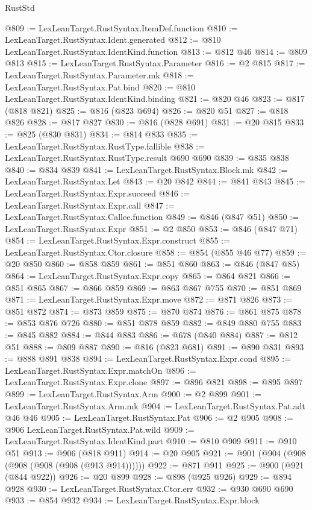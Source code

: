 \begin{lexlean}{RustStd}
\begin{coremodule}
@809 := LexLeanTarget.RustSyntax.ItemDef.function
@810 := LexLeanTarget.RustSyntax.Ident.generated
@812 := @810 LexLeanTarget.RustSyntax.IdentKind.function
@813 := @812 @46
@814 := @809 @813
@815 := LexLeanTarget.RustSyntax.Parameter
@816 := @2 @815
@817 := LexLeanTarget.RustSyntax.Parameter.mk
@818 := LexLeanTarget.RustSyntax.Pat.bind
@820 := @810 LexLeanTarget.RustSyntax.IdentKind.binding
@821 := @820 @46
@823 := @817 (@818 @821)
@825 := @816 (@823 @694)
@826 := @820 @51
@827 := @818 @826
@828 := @817 @827
@830 := @816 (@828 @691)
@831 := @20 @815
@833 := @825 (@830 @831)
@834 := @814 @833
@835 := LexLeanTarget.RustSyntax.RustType.fallible
@838 := LexLeanTarget.RustSyntax.RustType.result @690 @690
@839 := @835 @838
@840 := @834 @839
@841 := LexLeanTarget.RustSyntax.Block.mk
@842 := LexLeanTarget.RustSyntax.Let
@843 := @20 @842
@844 := @841 @843
@845 := LexLeanTarget.RustSyntax.Expr.succeed
@846 := LexLeanTarget.RustSyntax.Expr.call
@847 := LexLeanTarget.RustSyntax.Callee.function
@849 := @846 (@847 @51)
@850 := LexLeanTarget.RustSyntax.Expr
@851 := @2 @850
@853 := @846 (@847 @71)
@854 := LexLeanTarget.RustSyntax.Expr.construct
@855 := LexLeanTarget.RustSyntax.Ctor.closure
@858 := @854 (@855 @46 @77)
@859 := @20 @850
@860 := @858 @859
@861 := @851 @860
@863 := @846 (@847 @85)
@864 := LexLeanTarget.RustSyntax.Expr.copy
@865 := @864 @821
@866 := @851 @865
@867 := @866 @859
@869 := @863 @867 @755
@870 := @851 @869
@871 := LexLeanTarget.RustSyntax.Expr.move
@872 := @871 @826
@873 := @851 @872
@874 := @873 @859
@875 := @870 @874
@876 := @861 @875
@878 := @853 @876 @726
@880 := @851 @878 @859
@882 := @849 @880 @755
@883 := @845 @882
@884 := @844 @883
@886 := @678 (@840 @884)
@887 := @812 @51
@888 := @809 @887
@890 := @816 (@823 @681)
@891 := @890 @831
@893 := @888 @891 @838
@894 := LexLeanTarget.RustSyntax.Expr.cond
@895 := LexLeanTarget.RustSyntax.Expr.matchOn
@896 := LexLeanTarget.RustSyntax.Expr.clone
@897 := @896 @821
@898 := @895 @897
@899 := LexLeanTarget.RustSyntax.Arm
@900 := @2 @899
@901 := LexLeanTarget.RustSyntax.Arm.mk
@904 := LexLeanTarget.RustSyntax.Pat.adt @46 @46
@905 := LexLeanTarget.RustSyntax.Pat
@906 := @2 @905
@908 := @906 LexLeanTarget.RustSyntax.Pat.wild
@909 := LexLeanTarget.RustSyntax.IdentKind.part
@910 := @810 @909
@911 := @910 @51
@913 := @906 (@818 @911)
@914 := @20 @905
@921 := @901 (@904 (@908 (@908 (@908 (@908 (@913 @914))))))
@922 := @871 @911
@925 := @900 (@921 (@844 @922))
@926 := @20 @899
@928 := @898 (@925 @926)
@929 := @894 @928
@930 := LexLeanTarget.RustSyntax.Ctor.err
@932 := @930 @690 @690
@933 := @854 @932
@934 := LexLeanTarget.RustSyntax.Expr.block

\end{coremodule}
\end{lexlean}
